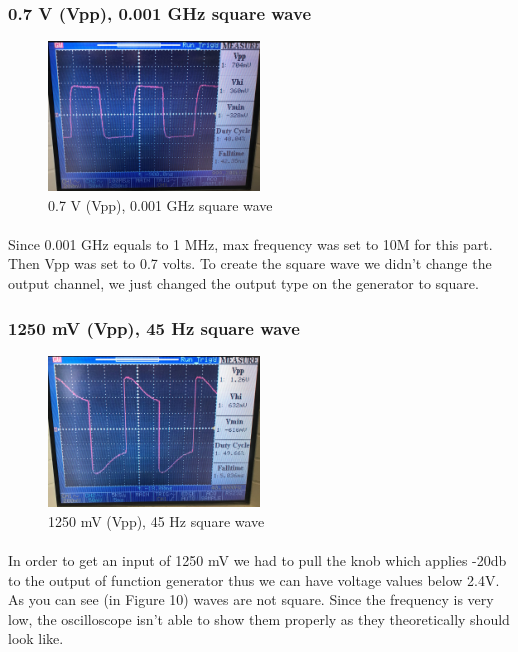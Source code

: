 \documentclass[pdftex,12pt,a4paper]{article}
\begin{document}
\newpage
\begin{flushleft}
\subsubsection{0.7 V (Vpp), 0.001 GHz square wave}
\begin{figure}[h]
    \centering
	\includegraphics[width=0.5\textwidth]{Photos/5_6_closeup.jpg}
	\caption{0.7 V (Vpp), 0.001 GHz square wave}
	\label{fig9}
\end{figure}

\paragraph{}
Since 0.001 GHz equals to 1 MHz, max frequency was set to 10M for this part. Then Vpp was set to 0.7 volts. To create the square wave we didn't change the output channel, we just changed the output type on the generator to square.

\end{flushleft}



\begin{flushleft}
\subsubsection{1250 mV (Vpp), 45 Hz square wave}
\begin{figure}[h]
    \centering
	\includegraphics[width=0.5\textwidth]{Photos/5_7_closeup.jpg}
	\caption{1250 mV (Vpp), 45 Hz square wave}
	\label{fig10}
\end{figure}
\paragraph{}
In order to get an input of 1250 mV we had to pull the knob which applies -20db to the output of function generator thus we can have voltage values below 2.4V. As you can see (in Figure 10) waves are not square. Since the frequency is very low, the oscilloscope isn't able to show them properly as they theoretically should look like.
\end{flushleft}
\end{document}
